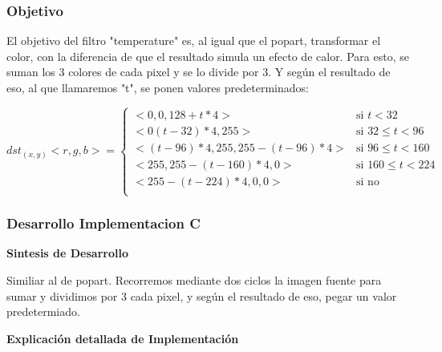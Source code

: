 \vspace*{0.3cm} \noindent
\subsubsection{Objetivo}
El objetivo del filtro "temperature" es, al igual que el popart, transformar el color, 
con la diferencia de que el resultado simula un efecto de calor.
Para esto, se suman los 3 colores de cada pixel y se lo divide por 3. 
Y según el resultado de eso, al que llamaremos "t", se ponen valores predeterminados:\newline


\[ dst_{(x,y)} < r, g, b > = \left\{ \begin{array}{ll}
        < 0, 0, 128 + t * 4> & \mbox{si $t < 32 $}\\
       < 0  (t - 32) * 4, 255> & \mbox{si $32 \leq t < 96 $}\\
        < (t - 96) * 4, 255, 255 - (t - 96) * 4 > & \mbox{si $96\leq t <160 $}\\
       < 255, 255 - (t - 160) * 4, 0> & \mbox{si $160 \leq t < 224 $}\\
        < 255 - (t - 224) * 4, 0, 0 > & \mbox{si no}\\\end{array} \right. \]




\vspace*{0.3cm} \noindent

\subsubsection{Desarrollo Implementacion C}

\begin{center}
\textbf{Sintesis de Desarrollo} 
\end{center}

Similiar al de popart. Recorremos mediante dos ciclos la imagen fuente para sumar y dividimos por 3 cada pixel,
y según el resultado de eso, pegar un valor predetermiado. \newline

\begin{center}
\textbf{Explicación detallada de Implementación}

\end{center}


